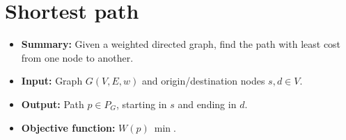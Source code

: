 \section{Shortest path} \label{algorithm-shortestpath}
\begin{itemize}
    \item \textbf{Summary:} Given a weighted directed graph, find the path with least cost from one node to another.
    \item \textbf{Input:} Graph $G(V,E,w)$ and origin/destination nodes $s, d \in V$.
    \item \textbf{Output:} Path $p \in P_G$, starting in $s$ and ending in $d$.
    \item \textbf{Objective function:} $W(p)~\min$.
\end{itemize}



